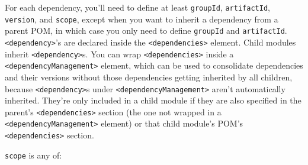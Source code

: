 \documentclass[table, xcdraw]{article}%
\begin{document}
For each dependency, you'll need to define at least \texttt{groupId}, \texttt{artifactId}, \texttt{version}, and \texttt{scope}, except when you want to inherit a dependency from a parent POM, in which case you only need to define \texttt{groupId} and \texttt{artifactId}. \texttt{<dependency>}'s are declared inside the \texttt{<dependencies>} element. Child modules inherit \texttt{<dependency>}s. You can wrap \texttt{<dependencies>} inside a \texttt{<dependencyManagement>} element, which can be used to consolidate dependencies and their versions without those dependencies getting inherited by all children, because \texttt{<dependency>}s under \texttt{<dependencyManagement>} aren't automatically inherited. They're only included in a child module if they are also specified in the parent's \texttt{<dependencies>} section (the one not wrapped in a \texttt{<dependencyManagement>} element) or that child module's POM's \texttt{<dependencies>} section.

\texttt{scope} is any of:
\end{document}
